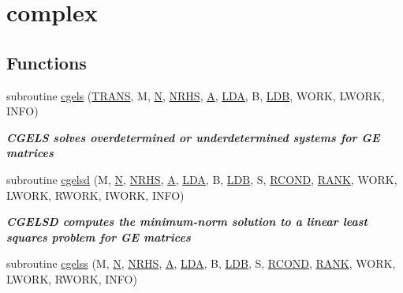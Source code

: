 \hypertarget{group__complexGEsolve}{}\section{complex}
\label{group__complexGEsolve}
\subsection*{Functions}
\begin{DoxyCompactItemize}
\item 
subroutine \hyperlink{group__complexGEsolve_ga009f11bc846e7a02af4650924230c38c}{cgels} (\hyperlink{superlu__enum__consts_8h_a0c4e17b2d5cea33f9991ccc6a6678d62a1f61e3015bfe0f0c2c3fda4c5a0cdf58}{T\+R\+A\+N\+S}, M, \hyperlink{polmisc_8c_a0240ac851181b84ac374872dc5434ee4}{N}, \hyperlink{example__user_8c_aa0138da002ce2a90360df2f521eb3198}{N\+R\+H\+S}, \hyperlink{classA}{A}, \hyperlink{example__user_8c_ae946da542ce0db94dced19b2ecefd1aa}{L\+D\+A}, B, \hyperlink{example__user_8c_a50e90a7104df172b5a89a06c47fcca04}{L\+D\+B}, W\+O\+R\+K, L\+W\+O\+R\+K, I\+N\+F\+O)
\begin{DoxyCompactList}\small\item\em {\bfseries  C\+G\+E\+L\+S solves overdetermined or underdetermined systems for G\+E matrices} \end{DoxyCompactList}\item 
subroutine \hyperlink{group__complexGEsolve_gabe955d518aa1f5fec04eb13fb9ee56c2}{cgelsd} (M, \hyperlink{polmisc_8c_a0240ac851181b84ac374872dc5434ee4}{N}, \hyperlink{example__user_8c_aa0138da002ce2a90360df2f521eb3198}{N\+R\+H\+S}, \hyperlink{classA}{A}, \hyperlink{example__user_8c_ae946da542ce0db94dced19b2ecefd1aa}{L\+D\+A}, B, \hyperlink{example__user_8c_a50e90a7104df172b5a89a06c47fcca04}{L\+D\+B}, S, \hyperlink{superlu__enum__consts_8h_af00a42ecad444bbda75cde1b64bd7e72a9b5c151728d8512307565994c89919d5}{R\+C\+O\+N\+D}, \hyperlink{splinemodule_8c_a3a88bcc63386de30443dacede2e01847}{R\+A\+N\+K}, W\+O\+R\+K, L\+W\+O\+R\+K, R\+W\+O\+R\+K, I\+W\+O\+R\+K, I\+N\+F\+O)
\begin{DoxyCompactList}\small\item\em {\bfseries  C\+G\+E\+L\+S\+D computes the minimum-\/norm solution to a linear least squares problem for G\+E matrices} \end{DoxyCompactList}\item 
subroutine \hyperlink{group__complexGEsolve_ga104cdf5ce9195df46ace1749820a7d4a}{cgelss} (M, \hyperlink{polmisc_8c_a0240ac851181b84ac374872dc5434ee4}{N}, \hyperlink{example__user_8c_aa0138da002ce2a90360df2f521eb3198}{N\+R\+H\+S}, \hyperlink{classA}{A}, \hyperlink{example__user_8c_ae946da542ce0db94dced19b2ecefd1aa}{L\+D\+A}, B, \hyperlink{example__user_8c_a50e90a7104df172b5a89a06c47fcca04}{L\+D\+B}, S, \hyperlink{superlu__enum__consts_8h_af00a42ecad444bbda75cde1b64bd7e72a9b5c151728d8512307565994c89919d5}{R\+C\+O\+N\+D}, \hyperlink{splinemodule_8c_a3a88bcc63386de30443dacede2e01847}{R\+A\+N\+K}, W\+O\+R\+K, L\+W\+O\+R\+K, R\+W\+O\+R\+K, I\+N\+F\+O)

\end{DoxyCompactItemize}
